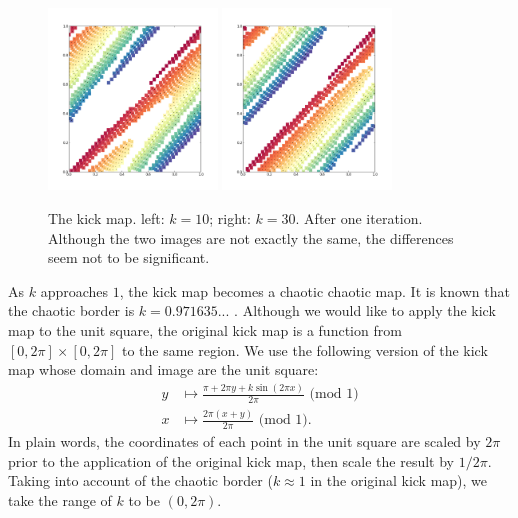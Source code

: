 \documentclass[12pt,draft]{reedmcm}
\begin{document}
\begin{figure}[h!]
  \centering
  \includegraphics[width=0.4\textwidth]{kickmap_2pi}
  \hspace{2cm}
  \includegraphics[width=0.4\textwidth]{kickmap_3pi}
  \caption{The kick map. left: $k=10$; right: $k = 30$. After one iteration. 
    Although the two images are not exactly the same, the differences seem not to be significant.
  }
  \label{fig:kickmap_demo2}
\end{figure}
%
As $k$ approaches $1$, the kick map becomes a chaotic chaotic map.
It is known that the chaotic border is $k = 0.971635...$ \citep{spedia}.
Although we would like to apply the kick map to the unit square, the original kick map is a function from $[0,2\pi] \times [0,2\pi]$ to the same region.
We use the following version of the kick map whose domain and image are the unit square:
\begin{align*}
  y &\mapsto \frac{\pi + 2\pi y + k \sin (2\pi x)}{2\pi} \mbox{ (mod 1)}\\
  x &\mapsto \frac{2\pi (x + y)}{2\pi} \mbox{ (mod 1)}.
\end{align*}
In plain words, the coordinates of each point in the unit square are scaled by $2\pi$ prior to the application of the original kick map, then scale the result by $1/2\pi$.
Taking into account of the chaotic border ($k\approx 1$ in the original kick map), we take the range of $k$ to be $(0,2\pi)$.
\end{document}
